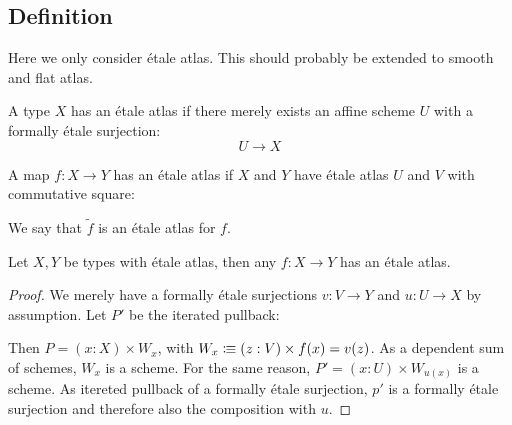 \subsection{Definition}

\begin{remark}
Here we only consider étale atlas. This should probably be extended to smooth and flat atlas.
\end{remark}

\begin{definition}
A type $X$ has an étale atlas if there merely exists an affine scheme $U$ with a formally étale surjection:
\[U\to X\]
\end{definition}

\begin{definition}
A map $f:X\to Y$ has an étale atlas if $X$ and $Y$ have étale atlas $U$ and $V$ with commutative square:
  \begin{center}
  \end{center}
We say that $\widetilde{f}$ is an étale atlas for $f$.
\end{definition}

\begin{lemma}
  Let $X,Y$ be types with étale atlas, then any $f:X\to Y$ has an étale atlas.
\end{lemma}

\begin{proof}
  We merely have a formally étale surjections $v:V\to Y$ and $u:U\to X$ by assumption.
  Let $P'$ be the iterated pullback:
  \begin{center}
  \end{center}
  Then $P=(x:X)\times W_x$, with $W_x\vcentcolon\mspace{-1.2mu}\equiv (z:V)\times f(x)=v(z)$.
  As a dependent sum of schemes, $W_x$ is a scheme.
  For the same reason, $P'=(x:U)\times W_{u(x)}$ is a scheme.
  As itereted pullback of a formally étale surjection,
  $p'$ is a formally étale surjection and
  therefore also the composition with $u$.
\end{proof}

